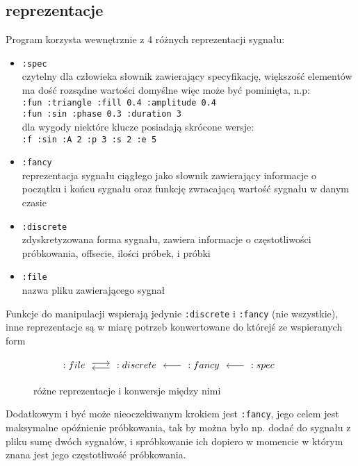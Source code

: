 \documentclass[12pt]{article}
\newcommand{\cljt}[1]{\texttt{#1}}
\begin{document}
\subsection{reprezentacje}
Program korzysta wewnętrznie z 4 różnych reprezentacji sygnału:
\begin{itemize}
	\item		\cljt{:spec} \\
	      czytelny dla człowieka słownik zawierający specyfikację, większość elementów ma dość rozsądne wartości domyślne więc może być pominięta, n.p:\\
	      \cljt{{:fun :triangle :fill 0.4 :amplitude 0.4}} \\
	      \cljt{{:fun :sin :phase 0.3 :duration 3}} \\
	      dla wygody niektóre klucze posiadają skrócone wersje: \\
	      \cljt{{:f :sin :A 2 :p 3 :s 2 :e 5}}

	\item		\cljt{:fancy} \\
	      reprezentacja sygnału ciągłego jako słownik zawierający informacje o początku i końcu sygnału oraz funkcję zwracającą wartość sygnału w danym czasie
	\item		\cljt{:discrete} \\
	      zdyskretyzowana forma sygnału, zawiera informacje o częstotliwości próbkowania, offsecie, ilości próbek, i próbki
	\item		\cljt{:file} \\
	      nazwa pliku zawierającego sygnał
\end{itemize}
Funkcje do manipulacji wspierają jedynie \cljt{:discrete} i \cljt{:fancy} (nie wszystkie), inne reprezentacje są w miarę potrzeb konwertowane do którejś ze wspieranych form
\begin{figure}
	\[\begin{tikzcd}[%
				cells={},
				every arrow/.append style={shorten <= 1mm, shorten >= 1mm}] %
			:file \arrow[shift left]{r} &
			:discrete \arrow[shift left]{l} &
			:fancy \arrow{l} &
			:spec \arrow{l} &
		\end{tikzcd}\]
	\caption{różne reprezentacje i konwersje między nimi}
\end{figure}

Dodatkowym i być może nieoczekiwanym krokiem jest \cljt{:fancy}, jego celem jest maksymalne opóźnienie próbkowania, tak by można było np. dodać do sygnału z pliku sumę dwóch sygnałów, i spróbkowanie ich dopiero w momencie w którym znana jest jego częstotliwość próbkowania.
\end{document}

